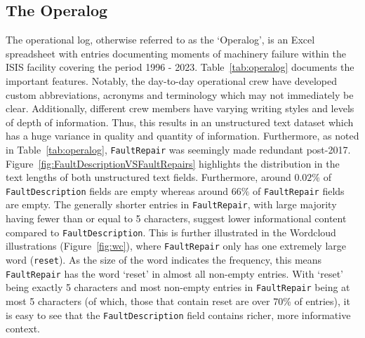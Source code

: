 \documentclass[10pt,oneside]{report}
\begin{document}
\subsection{The Operalog}
The operational log, otherwise referred to as the `Operalog', is an Excel spreadsheet with entries documenting moments of machinery failure within the ISIS facility covering the period 1996 - 2023. Table~\ref{tab:operalog} documents the important features. Notably, the day-to-day operational crew have developed custom abbreviations, acronyms and terminology which may not immediately be clear. Additionally, different crew members have varying writing styles and levels of depth of information. Thus, this results in an unstructured text dataset which has a huge variance in quality and quantity of information. Furthermore, as noted in Table~\ref{tab:operalog}, \texttt{FaultRepair} was seemingly made redundant post-2017. Figure~\ref{fig:FaultDescriptionVSFaultRepairs} highlights the distribution in the text lengths of both unstructured text fields. Furthermore, around $0.02\%$ of \texttt{FaultDescription} fields are empty whereas around $66\%$ of \texttt{FaultRepair} fields are empty. The generally shorter entries in \texttt{FaultRepair}, with large majority having fewer than or equal to 5 characters, suggest lower informational content compared to \texttt{FaultDescription}. This is further illustrated in the Wordcloud illustrations \cite{oesper2011wordcloud} (Figure~\ref{fig:wc}), where \texttt{FaultRepair} only has one extremely large word (\texttt{reset}). As the size of the word indicates the frequency, this means \texttt{FaultRepair} has the word `reset' in almost all non-empty entries. With `reset' being exactly 5 characters and most non-empty entries in \texttt{FaultRepair} being at most 5 characters (of which, those that contain reset are over 70\% of entries), it is easy to see that the \texttt{FaultDescription} field contains richer, more informative context. 
\end{document}
